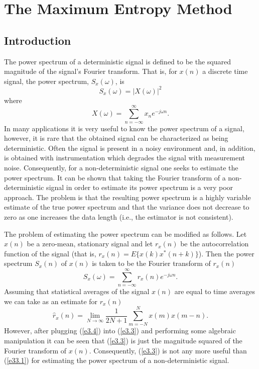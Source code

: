 \section{The Maximum Entropy Method}
\subsection{Introduction}

	The power spectrum of a deterministic signal
is defined to be the squared magnitude of the signal's Fourier
transform.  That is, for $x(n)$ a discrete time signal, the power spectrum,
$S_x(\omega)$, is 
%
\begin{equation}
     S_x(\omega)=|X(\omega)|^2
\label{e33.1}
\end{equation}
%
where
%
\begin{equation}
     X(\omega)=\sum_{n=-\infty}^{\infty}x_ne^{-j\omega n}.
\label{e3.2}
\end{equation}
%
In many applications it is very useful to know
the power spectrum of a signal, however, it is
rare that the obtained signal can be characterized as being
deterministic.  Often the signal is present in a noisy
environment and, in addition, is obtained with instrumentation
which degrades the signal with measurement noise.  Consequently, for a 
non-deterministic signal one seeks to estimate the power spectrum.
It can be shown \cite{oppen} that taking
the Fourier transform of a non-deterministic
signal in order to estimate its power spectrum is a very poor
approach.  The problem is that the resulting power spectrum
is a highly variable estimate of the true power spectrum
and that the variance does not decrease to zero as one
increases the data length (i.e., the estimator is not consistent).

	The problem of estimating the power spectrum
can be modified as follows.  Let
$x(n)$ be a zero-mean, stationary signal and let $r_x(n)$ be the autocorrelation
function of the signal (that is, $r_x(n)=E\{x(k)x^*(n+k)\}$).
Then the power spectrum $S_x(n)$ of $x(n)$ is taken to be the Fourier transform
of $r_x(n)$
%
\begin{equation}
     S_x(\omega)=\sum_{n=-\infty}^{\infty}r_x(n)e^{-j\omega n}.
\label{e3.3}
\end{equation}
%
Assuming that statistical averages of the signal $x(n)$ are equal to
time averages we can take as an estimate for $r_x(n)$
%
\begin{equation}
     \hat{r}_x(n)=\lim_{N\rightarrow\infty}\frac{1}{2N+1}\sum_{m=-N}^{N}x(m)x(m-n).
\label{e3.4}
\end{equation}
%
However, after plugging (\ref{e3.4}) into (\ref{e3.3}) and performing some
algebraic manipulation it can be seen that (\ref{e3.3}) is just
the magnitude squared of the Fourier transform of $x(n)$.
Consequently, (\ref{e3.3}) is not any more useful than (\ref{e33.1}) for estimating the
power spectrum of a non-deterministic signal.

